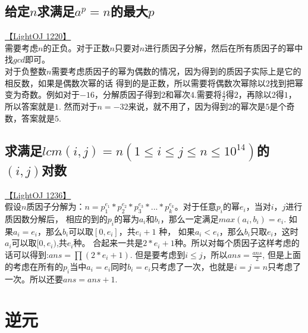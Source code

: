 \subsection{给定$n$求满足$a^p = n$的最大$p$}

\underline{【LightOJ  1220】} \\

需要考虑$n$的正负。对于正数$n$只要对$n$进行质因子分解，然后在所有质因子的幂中找$gcd$即可。 \\
对于负整数$n$需要考虑质因子的幂为偶数的情况，因为得到的质因子实际上是它的相反数，如果是偶数次幂的话 得到的是正数，所以需要将偶数次幂除以$2$找到把幂变为奇数。例如对于$-16$，分解质因子得到$2$和幂次$4$.需要将$\frac{4}{2}$得$2$，再除以$2$得$1$，所以答案就是$1$. 然而对于$n = -32$来说，就不用了，因为得到$2$的幂次是$5$是个奇数，答案就是$5$. \\

\subsection{求满足$lcm(i, j) = n(1\leq i \leq j \leq n\leq 10^{14})$的$(i, j)$对数}

\underline{【LightOJ  1236】}\\

假设$n$质因子分解为：$n = p_1^{e_1} * p_2^{e_2} * p_3^{e_3} * ... * p_k^{e_k}$。对于任意${p_i}$的幂${e_i}$，当对$i，j$进行质因数分解后， 相应的到的$p_i$的幂为$a_i$和$b_i$，那么一定满足$max(a_i, b_i)=e_i$. 如果$a_i = e_i$，那么$b_i$可以取$[0, e_i]$，共$e_i+1$ 种， 如果$a_i < e_i$，那么$b_i$只取$e_i$，这时$a_i$可以取$[0, e_i)$,共$e_i$种。 合起来一共是$2*e_i+1$种。所以对每个质因子这样考虑的话可以得到:$ans = ∏(2*e_i+1)$. 但是要考虑到$i\leq j $，所以$ans = \frac{ans}{2}$, 但是上面的考虑在所有的$p_i$当中$a_i = e_i$同时$b_i = e_i$只考虑了一次，也就是$i=j=n$只考虑了一次。所以还要$ans = ans + 1$.

\section{逆元}


